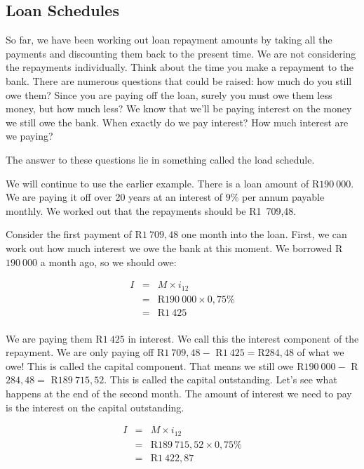 \subsection{Loan Schedules}
\label{ss:loadschedules}

So far, we have been working out loan repayment amounts by taking all the payments and discounting them back to the present time. We are not considering the repayments individually. Think about the time you make a repayment to the bank. There are numerous questions that could be raised: how much do you still owe them? Since you are paying off the loan, surely you must owe them less money, but how much less? We know that we'll be paying interest on the money we still owe the bank. When exactly do we pay interest? How much interest are we paying?

The answer to these questions lie in something called the load schedule.

We will continue to use the earlier example. There is a loan amount of R$190~000$. We are paying it off over 20 years at an interest of $9\%$ per annum payable monthly. We worked out that the repayments should be R1~709,48.

Consider the first payment of R$1~709,48$ one month into the loan. First, we can work out how much interest we owe the bank at this moment. We borrowed R$190~000$ a month ago, so we should owe:

\begin{eqnarray*}
I &=& M \times i_{12}\\
&=& \mbox{R}190~000 \times 0,75\%\\
&=& \mbox{R}1~425\\
\end{eqnarray*}

We are paying them R$1~425$ in interest. We call this the interest component of the repayment. We are only paying off R$1~709,48 -$ R$1~425 = $R$284,48$ of what we owe! This is called the capital component. That means we still owe R$190~000 -$ R$284,48 =$ R$189~715,52$. This is called the capital outstanding. Let's see what happens at the end of the second month. The amount of interest we need to pay is the interest on the capital outstanding.

\begin{eqnarray*}
I &=& M \times i_{12}\\
&=& \mbox{R}189~715,52 \times 0,75\%\\
&=& \mbox{R}1~422,87\\
\end{eqnarray*}

